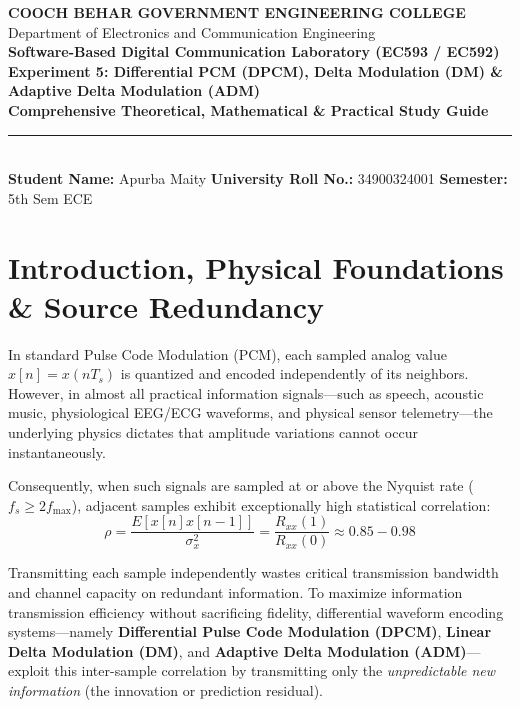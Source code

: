 \documentclass[11pt,a4paper]{article}
\begin{document}
\begin{center}
{\Large \textbf{\textcolor{primary}{COOCH BEHAR GOVERNMENT ENGINEERING COLLEGE}}}\\[1.5mm]
{\large Department of Electronics and Communication Engineering}\\[2.5mm]
{\Large \textbf{\textcolor{secondary}{Software-Based Digital Communication Laboratory (EC593 / EC592)}}}\\[2mm]
{\LARGE \textbf{Experiment 5: Differential PCM (DPCM), Delta Modulation (DM) \& Adaptive Delta Modulation (ADM)}}\\[2mm]
{\large \textbf{Comprehensive Theoretical, Mathematical \& Practical Study Guide}}\\[2.5mm]
\rule{\linewidth}{1.0pt}\\[2mm]
\small \textbf{Student Name:} Apurba Maity \quad \textbf{University Roll No.:} 34900324001 \quad \textbf{Semester:} 5th Sem ECE
\end{center}

\vspace{3mm}

\section{Introduction, Physical Foundations \& Source Redundancy}
In standard Pulse Code Modulation (PCM), each sampled analog value $x[n] = x(n T_s)$ is quantized and encoded independently of its neighbors. However, in almost all practical information signals---such as speech, acoustic music, physiological EEG/ECG waveforms, and physical sensor telemetry---the underlying physics dictates that amplitude variations cannot occur instantaneously. 

Consequently, when such signals are sampled at or above the Nyquist rate ($f_s \ge 2 f_{\max}$), adjacent samples exhibit exceptionally high statistical correlation:
\begin{equation}
\rho = \frac{E[x[n] x[n-1]]}{\sigma_x^2} = \frac{R_{xx}(1)}{R_{xx}(0)} \approx 0.85 - 0.98
\end{equation}

Transmitting each sample independently wastes critical transmission bandwidth and channel capacity on redundant information. To maximize information transmission efficiency without sacrificing fidelity, differential waveform encoding systems---namely \textbf{Differential Pulse Code Modulation (DPCM)}, \textbf{Linear Delta Modulation (DM)}, and \textbf{Adaptive Delta Modulation (ADM)}---exploit this inter-sample correlation by transmitting only the \textit{unpredictable new information} (the innovation or prediction residual).
\end{document}
